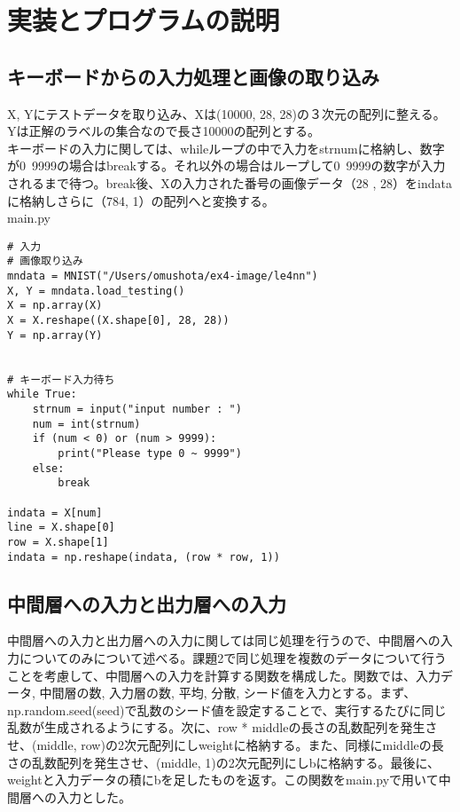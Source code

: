 \documentclass{ujarticle}
\begin{document}
\section{実装とプログラムの説明}
\subsection{キーボードからの入力処理と画像の取り込み}
X, Yにテストデータを取り込み、Xは(10000, 28, 28)の３次元の配列に整える。Yは正解のラベルの集合なので長さ10000の配列とする。\\
キーボードの入力に関しては、whileループの中で入力をstrnumに格納し、数字が0~9999の場合はbreakする。それ以外の場合はループして0~9999の数字が入力されるまで待つ。break後、Xの入力された番号の画像データ（28 , 28）をindataに格納しさらに（784, 1）の配列へと変換する。\\

main.py
\begin{lstlisting}[basicstyle=\ttfamily\footnotesize, frame=single]
# 入力
# 画像取り込み
mndata = MNIST("/Users/omushota/ex4-image/le4nn")
X, Y = mndata.load_testing()
X = np.array(X)
X = X.reshape((X.shape[0], 28, 28))
Y = np.array(Y)


# キーボード入力待ち
while True:
    strnum = input("input number : ")
    num = int(strnum)
    if (num < 0) or (num > 9999):
        print("Please type 0 ~ 9999")
    else:
        break

indata = X[num]
line = X.shape[0]
row = X.shape[1]
indata = np.reshape(indata, (row * row, 1))
\end{lstlisting}


\subsection{中間層への入力と出力層への入力}
中間層への入力と出力層への入力に関しては同じ処理を行うので、中間層への入力についてのみについて述べる。課題2で同じ処理を複数のデータについて行うことを考慮して、中間層への入力を計算する関数を構成した。関数では、入力データ, 中間層の数, 入力層の数, 平均, 分散, シード値を入力とする。まず、np.random.seed(seed)で乱数のシード値を設定することで、実行するたびに同じ乱数が生成されるようにする。次に、row * middleの長さの乱数配列を発生させ、(middle, row)の2次元配列にしweightに格納する。また、同様にmiddleの長さの乱数配列を発生させ、(middle, 1)の2次元配列にしbに格納する。最後に、weightと入力データの積にbを足したものを返す。この関数をmain.pyで用いて中間層への入力とした。\\
\end{document}
